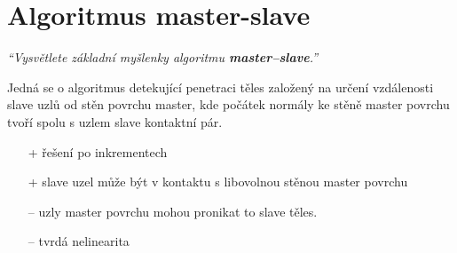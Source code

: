 \documentclass{article}
\begin{document}
	\section{Algoritmus master-slave}
	\emph{``Vysvětlete základní myšlenky algoritmu \textbf{master–slave}.''}

	Jedná se o algoritmus detekující penetraci těles založený na určení vzdálenosti slave uzlů od stěn povrchu master, kde počátek normály ke stěně master povrchu tvoří spolu s uzlem slave kontaktní pár.

	\begin{itemize}
	\item [+] řešení po inkrementech
	\item [+] slave uzel může být v kontaktu s libovolnou stěnou master povrchu
	\item [--] uzly master povrchu mohou pronikat to slave těles.
	\item [--] tvrdá nelinearita
	\end{itemize}
\end{document}
